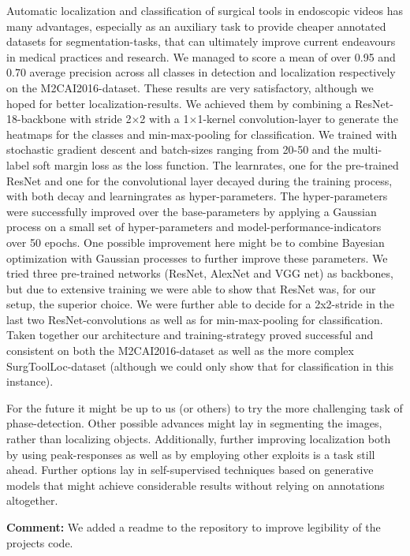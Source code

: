 Automatic localization and classification of surgical tools in endoscopic videos has many advantages, especially as an auxiliary task to provide cheaper annotated datasets for segmentation-tasks, that can ultimately improve current endeavours in medical practices and research. We managed to score a mean of over 0.95 and 0.70 average precision across all classes in detection and localization respectively on the M2CAI2016-dataset. 
These results are very satisfactory, although we hoped for better localization-results. We achieved them by combining a ResNet-18-backbone with stride 2$\times$2 with a 1$\times$1-kernel convolution-layer to generate the heatmaps for the classes and min-max-pooling for classification. 
We trained with stochastic gradient descent and batch-sizes ranging from 20-50 and the multi-label soft margin loss as the loss function. The learnrates, one for the pre-trained ResNet and one for the convolutional layer decayed during the training process, with both decay and learningrates as hyper-parameters.
The hyper-parameters were successfully improved over the base-parameters by applying a Gaussian process on a small set of hyper-parameters and model-performance-indicators over 50 epochs. One possible improvement here might be to combine Bayesian optimization with Gaussian processes to further improve these parameters.
We tried three pre-trained networks (ResNet, AlexNet and VGG net) as backbones, but due to extensive training we were able to show that ResNet was, for our setup, the superior choice. We were further able to decide for a 2x2-stride in the last two ResNet-convolutions as well as for min-max-pooling for classification. Taken together our architecture and training-strategy proved successful and consistent on both the M2CAI2016-dataset as well as the more complex SurgToolLoc-dataset (although we could only show that for classification in this instance).

For the future it might be up to us (or others) to try the more challenging task of phase-detection. Other possible advances might lay in segmenting the images, rather than localizing objects. Additionally, further improving localization both by using peak-responses as well as by employing other exploits is a task still ahead. Further options lay in self-supervised techniques based on generative models that might achieve considerable results without relying on annotations altogether.

\textbf{Comment:} We added a readme to the repository to improve legibility of the projects code.